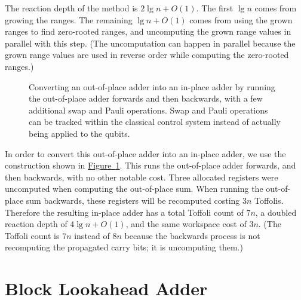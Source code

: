 \documentclass[onecolumn,unpublished]{quantumarticle}
\theoremstyle{definition}
\theoremstyle{definition}
\theoremstyle{definition}
\newcommand{\fig}[1]{\hyperref[fig:#1]{Figure~\ref*{fig:#1}}}
\begin{document}
The reaction depth of the method is $2 \lg n  + O(1)$.
The first $\lg n$ comes from growing the ranges.
The remaining $\lg n + O(1)$ comes from using the grown ranges to find zero-rooted ranges, and uncomputing the grown range values in parallel with this step.
(The uncomputation can happen in parallel because the grown range values are used in reverse order while computing the zero-rooted ranges.)

\begin{figure}
\centering
{}
    \caption{
        Converting an out-of-place adder into an in-place adder by running the out-of-place adder forwards and then backwards, with a few additional swap and Pauli operations.
        Swap and Pauli operations can be tracked within the classical control system instead of actually being applied to the qubits.
    }
    \label{fig:oop2ip}
\end{figure}

In order to convert this out-of-place adder into an in-place adder, we use the construction shown in \fig{oop2ip}.
This runs the out-of-place adder forwards, and then backwards, with no other notable cost.
Three allocated registers were uncomputed when computing the out-of-place sum.
When running the out-of-place sum backwards, these registers will be recomputed costing $3n$ Toffolis.
Therefore the resulting in-place adder has a total Toffoli count of $7n$, a doubled reaction depth of $4 \lg n + O(1)$, and the same workspace cost of $3n$.
(The Toffoli count is $7n$ instead of $8n$ because the backwards process is not recomputing the propagated carry bits; it is uncomputing them.)

\section{Block Lookahead Adder}
\label{sec:block}
\end{document}
